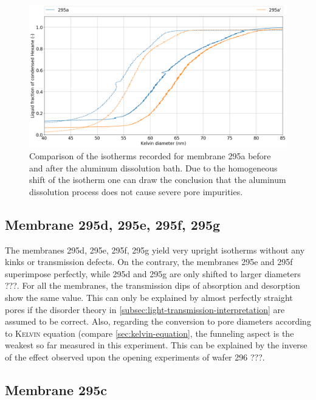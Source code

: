 \documentclass[thesis.tex]{subfiles}
\begin{document}
                \begin{figure}[ht]
                    \centering
                    \includegraphics[width=\textwidth]{images/295a'_vs_295a_d_kelvin.png}
                    \caption{Comparison of the isotherms recorded for membrane 295a before and after the aluminum dissolution bath. Due to the homogeneous shift of the isotherm one can draw the conclusion that the aluminum dissolution process does not cause severe pore impurities.}
                    \label{fig:295-al-before-after}
                \end{figure}


        \subsection{Membrane 295d, 295e, 295f, 295g}

            The membranes 295d, 295e, 295f, 295g yield very upright isotherms without any kinks or transmission defects. On the contrary, the membranes 295e and 295f superimpose perfectly, while 295d and 295g are only shifted to larger diameters ???. For all the membranes, the transmission dips of absorption and desorption show the same value. This can only be explained by almost perfectly straight pores if the disorder theory in \cref{subsec:light-transmission-interpretation} are assumed to be correct. Also, regarding the conversion to pore diameters according to \textsc{Kelvin} equation (compare \cref{sec:kelvin-equation}, the funneling aspect is the weakest so far measured in this experiment. This can be explained by the inverse of the effect observed upon the opening experiments of wafer 296 ???.


        \subsection{Membrane 295c}
\end{document}
